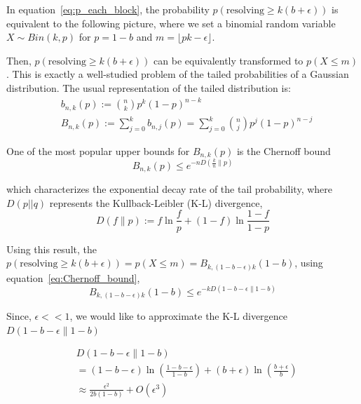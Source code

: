 \documentclass[%
 reprint,
superscriptaddress,
 amsmath,amssymb,
 aps,
]{revtex4-2}
\begin{document}
In equation~\ref{eq:p_each_block}, the probability $p(\text{resolving}\ge k(b+\epsilon))$ is equivalent to the following picture, where we set a binomial random variable $X \sim Bin(k, p)$ for $p=1-b$ and $m = \lfloor pk-\epsilon\rfloor$. 

Then, $p(\text{resolving}\ge k(b+\epsilon))$ can be equivalently transformed to $p(X\le m)$. This is exactly a well-studied problem of the tailed probabilities of a Gaussian distribution. The usual representation of the tailed distribution is:
\begin{equation}
\begin{aligned}
&b_{n, k}(p):=\binom{n}{k} p^k (1-p)^{n-k}\\
&B_{n, k}(p):=\sum_{j=0}^k b_{n, j}(p)=\sum_{j=0}^k\binom{n}{j} p^j (1-p)^{n-j}
\end{aligned}
\end{equation}

One of the most popular upper bounds for $B_{n,k}(p)$ is the Chernoff bound
\begin{equation}
    B_{n,k}(p)\le e^{-nD\left(\frac{k}{n}\|p\right)}
    \label{eq:Chernoff_bound}
\end{equation}

which characterizes the exponential decay rate of the tail probability, where $D(p||q)$ represents the Kullback-Leibler (K-L) divergence, 
\begin{equation}
D(f \| p):=f \ln \frac{f}{p}+(1-f) \ln \frac{1-f}{1-p}
\end{equation}

Using this result, the $p(\text{resolving}\ge k(b+\epsilon)) = p(X\le m) = B_{k, (1-b-\epsilon)k}(1-b)$, using equation~\ref{eq:Chernoff_bound},
\begin{equation}
    B_{k, (1-b-\epsilon)k}(1-b)\le e^{-kD\left(1-b-\epsilon\|1-b\right)}
\end{equation}

Since, $\epsilon<<1$, we would like to approximate the K-L divergence $D(1-b-\epsilon\|1-b)$

\begin{equation}
\begin{split}
    &D(1-b-\epsilon\|1-b)\\&=(1-b-\epsilon)\ln\left(\frac{1-b-\epsilon}{1-b}\right)+(b+\epsilon)\ln\left(\frac{b+\epsilon}{b}\right)\\
    &\approx \frac{\epsilon^2}{2b(1-b)}+O(\epsilon^3)
    \end{split}
\end{equation}
\end{document}
